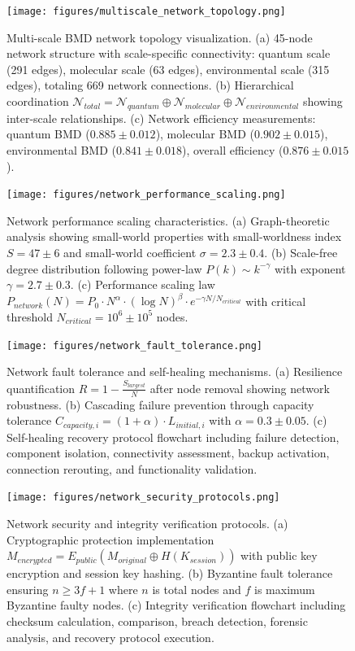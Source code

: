\begin{figure}[H]
\centering
\texttt{[image: figures/multiscale\_network\_topology.png]}
\caption{Multi-scale BMD network topology visualization. (a) 45-node network structure with scale-specific connectivity: quantum scale (291 edges), molecular scale (63 edges), environmental scale (315 edges), totaling 669 network connections. (b) Hierarchical coordination $\mathcal{N}_{total} = \mathcal{N}_{quantum} \oplus \mathcal{N}_{molecular} \oplus \mathcal{N}_{environmental}$ showing inter-scale relationships. (c) Network efficiency measurements: quantum BMD ($0.885 \pm 0.012$), molecular BMD ($0.902 \pm 0.015$), environmental BMD ($0.841 \pm 0.018$), overall efficiency ($0.876 \pm 0.015$).}
\label{fig:network_topology}
\end{figure}

\begin{figure}[H]
\centering
\texttt{[image: figures/network\_performance\_scaling.png]}
\caption{Network performance scaling characteristics. (a) Graph-theoretic analysis showing small-world properties with small-worldness index $S = 47 \pm 6$ and small-world coefficient $\sigma = 2.3 \pm 0.4$. (b) Scale-free degree distribution following power-law $P(k) \sim k^{-\gamma}$ with exponent $\gamma = 2.7 \pm 0.3$. (c) Performance scaling law $P_{network}(N) = P_0 \cdot N^{\alpha} \cdot (\log N)^{\beta} \cdot e^{-\gamma N/N_{critical}}$ with critical threshold $N_{critical} = 10^6 \pm 10^5$ nodes.}
\label{fig:network_scaling}
\end{figure}

\begin{figure}[H]
\centering
\texttt{[image: figures/network\_fault\_tolerance.png]}
\caption{Network fault tolerance and self-healing mechanisms. (a) Resilience quantification $R = 1 - \frac{S_{largest}}{N}$ after node removal showing network robustness. (b) Cascading failure prevention through capacity tolerance $C_{capacity,i} = (1 + \alpha) \cdot L_{initial,i}$ with $\alpha = 0.3 \pm 0.05$. (c) Self-healing recovery protocol flowchart including failure detection, component isolation, connectivity assessment, backup activation, connection rerouting, and functionality validation.}
\label{fig:network_fault_tolerance}
\end{figure}

\begin{figure}[H]
\centering
\texttt{[image: figures/network\_security\_protocols.png]}
\caption{Network security and integrity verification protocols. (a) Cryptographic protection implementation $M_{encrypted} = E_{public}(M_{original} \oplus H(K_{session}))$ with public key encryption and session key hashing. (b) Byzantine fault tolerance ensuring $n \geq 3f + 1$ where $n$ is total nodes and $f$ is maximum Byzantine faulty nodes. (c) Integrity verification flowchart including checksum calculation, comparison, breach detection, forensic analysis, and recovery protocol execution.}
\label{fig:network_security}
\end{figure}

